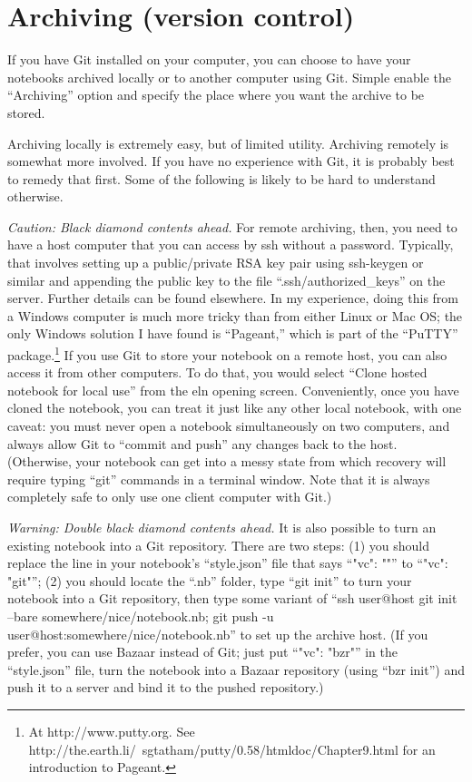 \documentclass[11pt]{report}
\begin{document}
\section{Archiving (version control)}

If you have Git installed on your computer, you can choose to have
your notebooks archived locally or to another computer using
Git. Simple enable the ``Archiving'' option and specify the place
where you want the archive to be stored.

Archiving locally is extremely easy, but of limited utility. Archiving
remotely is somewhat more involved. If you have no experience with
Git, it is probably best to remedy that first. Some of the following
is likely to be hard to understand otherwise.

\emph{Caution: Black diamond contents ahead.} For remote archiving,
then, you need to have a host computer that you can access by ssh
without a password. Typically, that involves setting up a
public/private RSA key pair using ssh-keygen or similar and appending
the public key to the file ``.ssh/authorized\_keys'' on the
server. Further details can be found elsewhere. In my experience,
doing this from a Windows computer is much more tricky than from
either Linux or Mac OS; the only Windows solution I have found is
``Pageant,'' which is part of the ``PuTTY'' package.\footnote{At
http://www.putty.org. See
http://the.earth.li/~sgtatham/putty/0.58/htmldoc/Chapter9.html for an
introduction to Pageant.} If you use Git to store your notebook on a
remote host, you can also access it from other computers. To do that,
you would select ``Clone hosted notebook for local use'' from the eln
opening screen. Conveniently, once you have cloned the notebook, you
can treat it just like any other local notebook, with one caveat: you
must never open a notebook simultaneously on two computers, and always
allow Git to ``commit and push'' any changes back to the
host. (Otherwise, your notebook can get into a messy state from which
recovery will require typing ``git'' commands in a terminal
window. Note that it is always completely safe to only use one client
computer with Git.)

\emph{Warning: Double black diamond contents ahead.} It is also
possible to turn an existing notebook into a Git repository. There are
two steps: (1) you should replace the line in your notebook's
``style.json'' file that says ``"vc": ""'' to ``"vc": "git"''; (2) you
should locate the ``.nb'' folder, type ``git init'' to turn your
notebook into a Git repository, then type some variant of ``ssh
user@host git init --bare somewhere/nice/notebook.nb; git push -u
user@host:somewhere/nice/notebook.nb'' to set up the archive host. (If
you prefer, you can use Bazaar instead of Git; just put ``"vc":
"bzr"'' in the ``style.json'' file, turn the notebook into a Bazaar
repository (using ``bzr init'') and push it to a server and bind it to
the pushed repository.)
\end{document}
